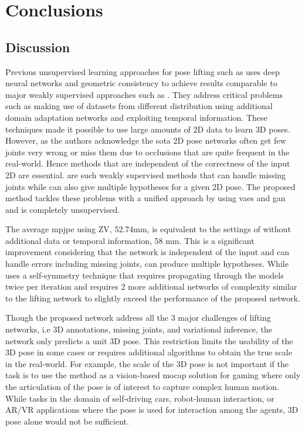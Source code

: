 \chapter{Conclusions}
\label{chap:conclusions}

\section{Discussion}
Previous unsupervised learning approaches for pose lifting such as \cite{amazon1} uses deep neural networks and geometric consistency to achieve results comparable to major weakly supervised approaches such as \cite{can3dpose}. They address critical problems such as making use of datasets from different distribution using additional domain adaptation networks and exploiting temporal information. These techniques made it possible to use large amounts of 2D data to learn 3D poses. However, as the authors acknowledge the \ac{sota} 2D pose networks often get few joints very wrong or miss them due to occlusions that are quite frequent in the real-world. Hence methods that are independent of the correctness of the input 2D are essential. \cite{c3dpo,weaklymultiple} are such weakly supervised methods that can handle missing joints while \cite{weaklymultiple} can also give multiple hypotheses for a given 2D pose. The proposed method tackles these problems with a unified approach by using \acp{vae} and \ac{gan} and is completely unsupervised.

The average \ac{mpjpe} using ZV, 52.74mm, is equivalent to the settings of \cite{amazon1} without additional data or temporal information, 58 mm. This is a significant improvement considering that the network is independent of the input and can handle errors including missing joints, can produce multiple hypotheses. While \cite{amazon1} uses a self-symmetry technique that requires propagating through the models twice per iteration and requires 2 more additional networks of complexity similar to the lifting network to slightly exceed the performance of the proposed network.

Though the proposed network address all the 3 major challenges of lifting networks, i.e 3D annotations, missing joints, and variational inference, the network only predicts a unit 3D pose. This restriction limits the usability of the 3D pose in some cases or requires additional algorithms to obtain the true scale in the real-world. For example, the scale of the 3D pose is not important if the task is to use the method as a vision-based \ac{mocap} solution for gaming where only the articulation of the pose is of interest to capture complex human motion. While tasks in the domain of self-driving cars, robot-human interaction, or AR/VR applications where the pose is used for interaction among the agents, 3D pose alone would not be sufficient.


